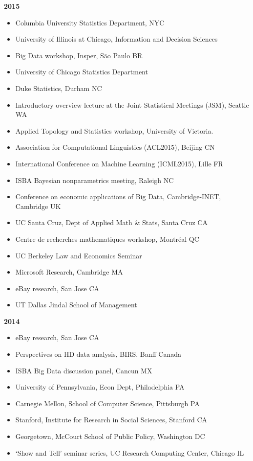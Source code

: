 \documentclass[margin,line]{res}
\begin{document}
\begin{resume}
{\bf 2015}
\begin{itemize}
\item Columbia University Statistics Department, NYC
\item University of Illinois at Chicago, Information and Decision Sciences 
\item Big Data workshop, Insper, S\~ao Paulo BR
\item University of Chicago Statistics Department
\item Duke Statistics, Durham NC
\item Introductory overview lecture at the Joint Statistical Meetings (JSM), Seattle WA
\item Applied Topology and Statistics workshop, University of Victoria.
\item Association for Computational Linguistics (ACL2015), Beijing CN
\item International Conference on Machine Learning (ICML2015), Lille FR
\item ISBA Bayesian nonparametrics meeting, Raleigh NC
\item Conference on economic applications of Big Data, Cambridge-INET, Cambridge UK
\item UC Santa Cruz, Dept of Applied Math \& Stats, Santa Cruz CA
\item Centre de recherches mathematiques workshop, Montr\'eal QC
\item UC Berkeley Law and Economics Seminar
\item Microsoft Research, Cambridge MA
\item eBay research, San Jose CA
\item UT Dallas Jindal School of Management
\end{itemize}


{\bf 2014}
\begin{itemize}
\item eBay research, San Jose CA
\item Perspectives on HD data analysis, BIRS, Banff Canada
\item ISBA Big Data discussion panel, Cancun MX
\item University of Pennsylvania, Econ Dept, Philadelphia PA
\item Carnegie Mellon, School of Computer Science, Pittsburgh PA 
\item Stanford, Institute for Research in Social Sciences, Stanford CA
\item Georgetown, McCourt School of Public Policy, Washington DC
\item `Show and Tell' seminar series, UC Research Computing Center, Chicago IL
\end{itemize}


\end{resume}
\end{document}
